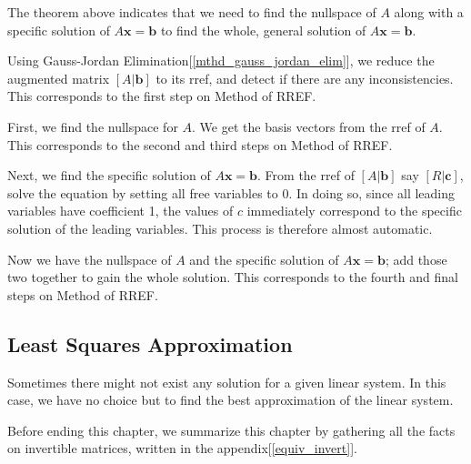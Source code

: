 \documentclass{report}
\begin{document}
			The theorem above indicates that we need to find the nullspace of $A$ along with a specific solution of $A\bm{x}=\bm{b}$ to find the whole, general solution of $A\bm{x}=\bm{b}$.
			
			Using Gauss-Jordan Elimination[\ref{mthd_gauss_jordan_elim}], we reduce the augmented matrix $\left[A|\bm{b}\right]$ to its rref, and detect if there are any inconsistencies. This corresponds to the first step on Method of RREF.
			
			First, we find the nullspace for $A$. We get the basis vectors from the rref of $A$. This corresponds to the second and third steps on Method of RREF.
			
			Next, we find the specific solution of $A\bm{x}=\bm{b}$. From the rref of $\left[A|\bm{b}\right]$ say $\left[R|\bm{c}\right]$, solve the equation by setting all free variables to 0. In doing so, since all leading variables have coefficient 1, the values of $c$ immediately correspond to the specific solution of the leading variables. This process is therefore almost automatic.
			
			Now we have the nullspace of $A$ and the specific solution of $A\bm{x}=\bm{b}$; add those two together to gain the whole solution. This corresponds to the fourth and final steps on Method of RREF.
			
		\subsection{Least Squares Approximation}%
			Sometimes there might not exist any solution for a given linear system. In this case, we have no choice but to find the best approximation of the linear system.
		
	
	Before ending this chapter, we summarize this chapter by gathering all the facts on invertible matrices, written in the appendix[\ref{equiv_invert}].
\end{document}
